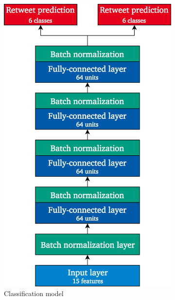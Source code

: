 \begin{figure}[h]
\begin{subfigure}{.4\textwidth}
  \includegraphics[width=.95\linewidth]{img/deep_1_class_architecture}
  \caption{Classification model}
  \label{fig:deep1_architecture_1}
\end{subfigure}%
\begin{subfigure}{.4\textwidth}

\end{subfigure}
\end{figure}
